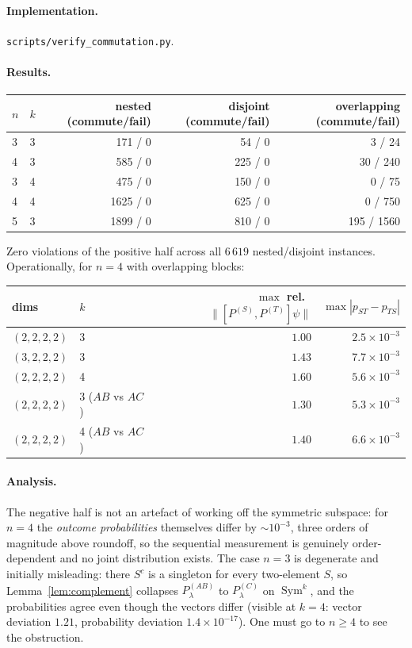 \documentclass[11pt]{article}
\theoremstyle{definition}
\theoremstyle{remark}
\newcommand{\Sym}{\operatorname{Sym}}
\begin{document}
\paragraph{Implementation.} \texttt{scripts/verify\_commutation.py}.

\paragraph{Results.}
{
\setlength{\tabcolsep}{8pt}
\renewcommand{\arraystretch}{1.2}
\begin{tabular}{llrrr}
\toprule
$n$ & $k$ & nested (commute/fail) & disjoint (commute/fail) & overlapping (commute/fail) \\
\midrule
3 & 3 & 171 / 0  & 54 / 0  & 3 / 24 \\
4 & 3 & 585 / 0  & 225 / 0 & 30 / 240 \\
3 & 4 & 475 / 0  & 150 / 0 & 0 / 75 \\
4 & 4 & 1625 / 0 & 625 / 0 & 0 / 750 \\
5 & 3 & 1899 / 0 & 810 / 0 & 195 / 1560 \\
\bottomrule
\end{tabular}
}

\medskip
\noindent Zero violations of the positive half across all $6\,619$ nested/disjoint
instances. Operationally, for $n = 4$ with overlapping blocks:

{
\setlength{\tabcolsep}{8pt}
\renewcommand{\arraystretch}{1.2}
\begin{tabular}{llrr}
\toprule
dims & $k$ & $\max$ rel.\ $\|[P^{(S)},P^{(T)}]\psi\|$ & $\max |p_{ST} - p_{TS}|$ \\
\midrule
$(2,2,2,2)$ & 3 & $1.00$ & $2.5 \times 10^{-3}$ \\
$(3,2,2,2)$ & 3 & $1.43$ & $7.7 \times 10^{-3}$ \\
$(2,2,2,2)$ & 4 & $1.60$ & $5.6 \times 10^{-3}$ \\
$(2,2,2,2)$ & 3 ($AB$ vs $AC$) & $1.30$ & $5.3 \times 10^{-3}$ \\
$(2,2,2,2)$ & 4 ($AB$ vs $AC$) & $1.40$ & $6.6 \times 10^{-3}$ \\
\bottomrule
\end{tabular}
}

\paragraph{Analysis.}
The negative half is not an artefact of working off the symmetric subspace: for $n=4$
the \emph{outcome probabilities} themselves differ by $\sim 10^{-3}$, three orders of
magnitude above roundoff, so the sequential measurement is genuinely order-dependent
and no joint distribution exists. The case $n = 3$ is degenerate and initially
misleading: there $S^c$ is a singleton for every two-element $S$, so
Lemma~\ref{lem:complement} collapses $P^{(AB)}_\lambda$ to $P^{(C)}_\lambda$ on
$\Sym^k$, and the probabilities agree even though the vectors differ (visible at
$k = 4$: vector deviation $1.21$, probability deviation $1.4\times10^{-17}$). One must
go to $n \ge 4$ to see the obstruction.
\end{document}
